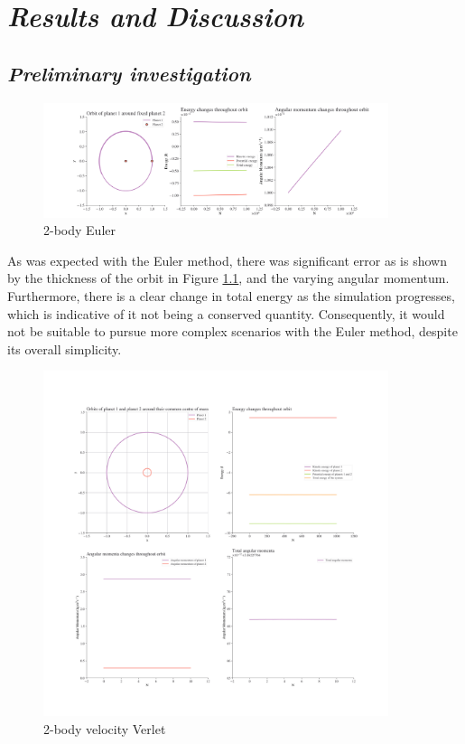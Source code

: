 \documentclass[11pt, english]{report}
\begin{document}
%

\chapter{\textsl{Results and Discussion}}
\section{\textsl{Preliminary investigation}}
\begin{figure}[ht]
    \centering
    \includegraphics[width=0.9\textwidth]{graphics/euler.png}
    \caption{2-body Euler}
    \label{fig:euler}
\end{figure}

\normalsize{\noindent As was expected with the Euler method, there was significant error as is shown by the thickness of the orbit in Figure \ref{fig:euler}, and the varying angular momentum. Furthermore, there is a clear change in total energy as the simulation progresses, which is indicative of it not being a conserved quantity. Consequently, it would not be suitable to pursue more complex scenarios with the Euler method, despite its overall simplicity.
}

\begin{figure}[ht]
    \centering
    \includegraphics[width=0.9\textwidth]{graphics/2b_verlet.png}
    \caption{2-body velocity Verlet}
    \label{fig:2b_verlet}
\end{figure}
\end{document}

